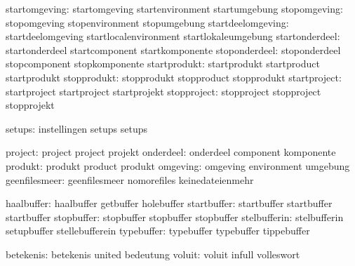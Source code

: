                 startomgeving:  startomgeving                startenvironment
                                startumgebung
                 stopomgeving:  stopomgeving                 stopenvironment
                                stopumgebung
            startdeelomgeving:  startdeelomgeving            startlocalenvironment
                                startlokaleumgebung
               startonderdeel:  startonderdeel               startcomponent
                                startkomponente
                stoponderdeel:  stoponderdeel                stopcomponent
                                stopkomponente
                 startprodukt:  startprodukt                 startproduct
                                startprodukt
                  stopprodukt:  stopprodukt                  stopproduct
                                stopprodukt
                 startproject:  startproject                 startproject
                                startprojekt
                  stopproject:  stopproject                  stopproject
                                stopprojekt

                       setups:  instellingen                 setups    
                                setups %

                      project:  project                      project
                                projekt
                    onderdeel:  onderdeel                    component
                                komponente
                      produkt:  produkt                      product
                                produkt
                     omgeving:  omgeving                     environment
                                umgebung
                geenfilesmeer:  geenfilesmeer                nomorefiles
                                keinedateienmehr

                   haalbuffer:  haalbuffer                   getbuffer
                                holebuffer
                  startbuffer:  startbuffer                  startbuffer
                                startbuffer
                   stopbuffer:  stopbuffer                   stopbuffer
                                stopbuffer
                 stelbufferin:  stelbufferin                 setupbuffer
                                stellebufferein
                   typebuffer:  typebuffer                   typebuffer
                                tippebuffer

                    betekenis:  betekenis                    united
                                bedeutung
                       voluit:  voluit                       infull
                                volleswort

